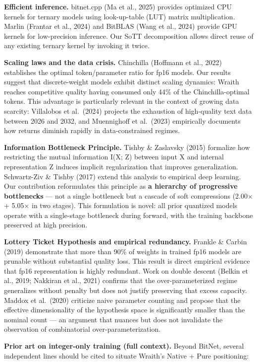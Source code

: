 \textbf{Efficient inference.} bitnet.cpp (Ma et al., 2025) provides
optimized CPU kernels for ternary models using look-up-table (LUT)
matrix multiplication. Marlin (Frantar et al., 2024) and BitBLAS (Wang
et al., 2024) provide GPU kernels for low-precision inference. Our SoTT
decomposition allows direct reuse of any existing ternary kernel by
invoking it twice.

\textbf{Scaling laws and the data crisis.} Chinchilla (Hoffmann et al.,
2022) establishes the optimal token/parameter ratio for fp16 models. Our
results suggest that discrete-weight models exhibit distinct scaling
dynamics: Wraith reaches competitive quality having consumed only 44\%
of the Chinchilla-optimal tokens. This advantage is particularly
relevant in the context of growing data scarcity: Villalobos et
al.~(2024) projects the exhaustion of high-quality text data between
2026 and 2032, and Muennighoff et al.~(2023) empirically documents how
returns diminish rapidly in data-constrained regimes.

\textbf{Information Bottleneck Principle.} Tishby \& Zaslavsky (2015)
formalize how restricting the mutual information I(X; Z) between input X
and internal representation Z induces implicit regularization that
improves generalization. Schwartz-Ziv \& Tishby (2017) extend this
analysis to empirical deep learning. Our contribution reformulates this
principle as \textbf{a hierarchy of progressive bottlenecks} --- not a
single bottleneck but a cascade of soft compressions (2.00× + 5.05× in
two stages). This formulation is novel: all prior quantized models
operate with a single-stage bottleneck during forward, with the training
backbone preserved at high precision.

\textbf{Lottery Ticket Hypothesis and empirical redundancy.} Frankle \&
Carbin (2019) demonstrate that more than 90\% of weights in trained fp16
models are prunable without substantial quality loss. This result is
direct empirical evidence that fp16 representation is highly redundant.
Work on double descent (Belkin et al., 2019; Nakkiran et al., 2021)
confirms that the over-parameterized regime generalizes without penalty
but does not justify preserving that excess capacity. Maddox et
al.~(2020) criticize naive parameter counting and propose that the
effective dimensionality of the hypothesis space is significantly
smaller than the nominal count --- an argument that nuances but does not
invalidate the observation of combinatorial over-parameterization.

\textbf{Prior art on integer-only training (full context).} Beyond
BitNet, several independent lines should be cited to situate Wraith's
Native + Pure positioning:

